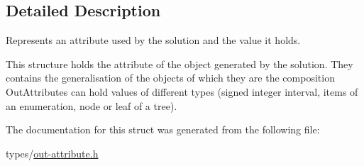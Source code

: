 \subsection{Detailed Description}
Represents an attribute used by the solution and the value it holds. 

This structure holds the attribute of the object generated by the solution. They contains the generalisation of the objects of which they are the composition Out\+Attributes can hold values of different types (signed integer interval, items of an enumeration, node or leaf of a tree). 

The documentation for this struct was generated from the following file\+:\begin{DoxyCompactItemize}
\item 
types/\hyperlink{out-attribute_8h}{out-\/attribute.\+h}\end{DoxyCompactItemize}
